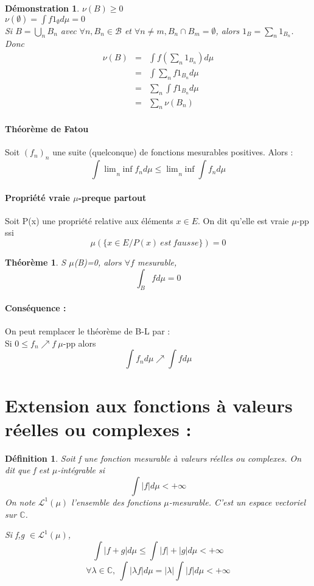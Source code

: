 \documentclass{article}
\theoremstyle{mes_theoremes}
\newtheorem{theo}{Théorème}[section]
\newtheorem*{Def}{Définition}
\newtheorem*{dem}{Démonstration}
\begin{document}
\begin{dem}
$\nu(B) \geq 0$ \\
$\nu(\emptyset)=\int f 1_{\emptyset} d\mu = 0$ \\
Si $B = \bigcup_n B_n$ avec $\forall n, B_n \in \mathcal{B}$ et $\forall n\neq m, B_n\cap B_m = \emptyset$, alors $1_B = \sum_n 1_{B_n}$. \\
Donc \begin{eqnarray*} \nu(B) &=& \int f(\sum_n 1_{B_n}) d\mu \\
&=& \int \sum_n f 1_{B_n} d\mu \\
&=& \sum_n \int f 1_{B_n} d\mu \\
&=& \sum_n \nu(B_n)
\end{eqnarray*}
\end{dem}

\paragraph{Théorème de Fatou \\}
Soit $(f_n)_n$ une suite (quelconque) de fonctions mesurables positives. Alors : \[\int \underset{n}{\lim\ \inf} f_n d\mu \leq \underset{n}{\lim\ \inf} \int f_n d\mu \]

\paragraph{Propriété vraie $\mu$-preque partout \\}
Soit P(x) une propriété relative aux éléments $x\in E$. On dit qu'elle est vraie $\mu$-pp ssi \[\mu(\{x\in E / P(x)\ est\ fausse\})=0\]

\begin{theo}
S $\mu$(B)=0, alors $\forall f$ mesurable, \[\int_B f d\mu = 0\]
\end{theo}

\paragraph{Conséquence :} On peut remplacer le théorème de B-L par : \\
Si $0 \leq f_n \nearrow f\ \mu$-pp alors \[\int f_n d\mu \nearrow \int f d\mu\]

\section{Extension aux fonctions à valeurs réelles ou complexes : \\}
\begin{Def}
Soit f une fonction mesurable à valeurs réelles ou complexes. On dit que f est $\mu$-intégrable si \[\int |f| d\mu < +\infty\]
On note $\mathcal{L}^1(\mu)$ l'ensemble des fonctions $\mu$-mesurable. C'est un espace vectoriel sur $\mathbb{C}$.

Si f,g $\in \mathcal{L}^1(\mu)$, \[\int |f+g| d\mu \leq \int |f| + |g| d\mu < +\infty\]
\[\forall \lambda \in \mathbb{C},\ \int |\lambda f| d\mu = |\lambda| \int |f| d\mu <+\infty\]
\end{Def}
\end{document}
